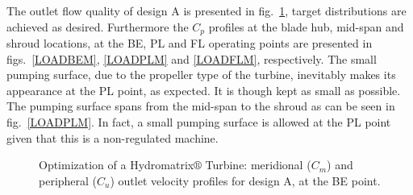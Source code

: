 The outlet flow quality of design A is presented in fig.\ \ref{out_MAT}, target distributions are achieved as desired.
Furthermore the $C_p$ profiles at the blade hub, mid-span and shroud locations, at the BE, PL and FL operating points are presented in figs.\ \ref{LOADBEM}, \ref{LOADPLM} and \ref{LOADFLM}, respectively. The small pumping surface, due to the propeller type of the turbine, inevitably makes its appearance at the PL point, as expected. It is though kept as small as possible. The pumping surface spans from the mid-span to the shroud as can be seen in fig.\  \ref{LOADPLM}. In fact, a small pumping surface is allowed at the PL point given that this is a non-regulated machine.            



\begin{figure}[h!]
\begin{minipage}[b]{1\linewidth}
 \centering
\end{minipage}
\caption{Optimization of a Hydromatrix$\circledR$ Turbine: meridional ($C_m$) and peripheral ($C_u$) outlet velocity profiles for design A, at the BE point.}
\label{out_MAT}
\end{figure}



